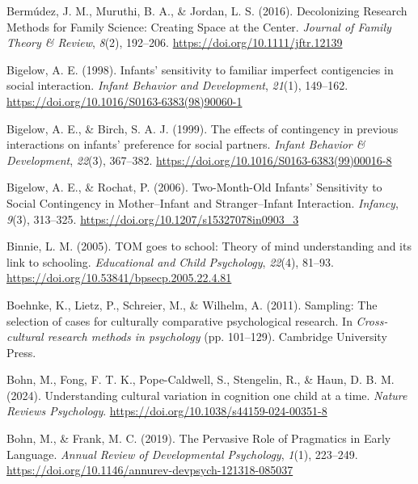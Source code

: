 \documentclass[
]{scrbook}
\newlength{\cslhangindent}
\newenvironment{CSLReferences}[2] %
 {\begin{list}{}{%
  \setlength{\itemindent}{0pt}
  \setlength{\leftmargin}{0pt}
  \setlength{\parsep}{0pt}
  \ifodd #1
   \setlength{\leftmargin}{\cslhangindent}
   \setlength{\itemindent}{-1\cslhangindent}
  \fi
  \setlength{\itemsep}{#2\baselineskip}}}
 {\end{list}}
\begin{document}
\begin{CSLReferences}{1}{0}
Bermúdez, J. M., Muruthi, B. A., \& Jordan, L. S. (2016). Decolonizing {Research Methods} for {Family Science}: {Creating Space} at the {Center}. \emph{Journal of Family Theory \& Review}, \emph{8}(2), 192--206. \url{https://doi.org/10.1111/jftr.12139}

Bigelow, A. E. (1998). Infants' sensitivity to familiar imperfect contigencies in social interaction. \emph{Infant Behavior and Development}, \emph{21}(1), 149--162. \url{https://doi.org/10.1016/S0163-6383(98)90060-1}

Bigelow, A. E., \& Birch, S. A. J. (1999). The effects of contingency in previous interactions on infants' preference for social partners. \emph{Infant Behavior \& Development}, \emph{22}(3), 367--382. \url{https://doi.org/10.1016/S0163-6383(99)00016-8}

Bigelow, A. E., \& Rochat, P. (2006). Two-{Month}-{Old Infants}' {Sensitivity} to {Social Contingency} in {Mother}--{Infant} and {Stranger}--{Infant Interaction}. \emph{Infancy}, \emph{9}(3), 313--325. \url{https://doi.org/10.1207/s15327078in0903_3}

Binnie, L. M. (2005). {TOM} goes to school: {Theory} of mind understanding and its link to schooling. \emph{Educational and Child Psychology}, \emph{22}(4), 81--93. \url{https://doi.org/10.53841/bpsecp.2005.22.4.81}

Boehnke, K., Lietz, P., Schreier, M., \& Wilhelm, A. (2011). Sampling: {The} selection of cases for culturally comparative psychological research. In \emph{Cross-cultural research methods in psychology} (pp. 101--129). Cambridge University Press.

Bohn, M., Fong, F. T. K., Pope-Caldwell, S., Stengelin, R., \& Haun, D. B. M. (2024). Understanding cultural variation in cognition one child at a time. \emph{Nature Reviews Psychology}. \url{https://doi.org/10.1038/s44159-024-00351-8}

Bohn, M., \& Frank, M. C. (2019). The {Pervasive Role} of {Pragmatics} in {Early Language}. \emph{Annual Review of Developmental Psychology}, \emph{1}(1), 223--249. \url{https://doi.org/10.1146/annurev-devpsych-121318-085037}


\end{CSLReferences}
\end{document}
